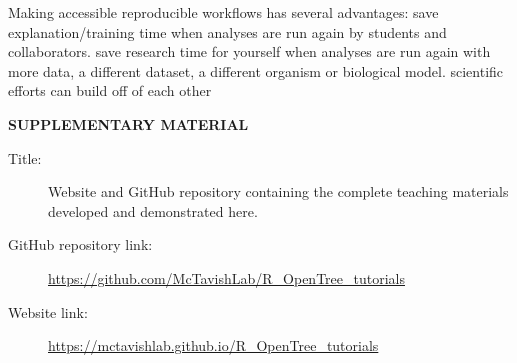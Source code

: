 \documentclass[12pt]{article}
\begin{document}
Making accessible reproducible workflows has several advantages:
save explanation/training time when analyses are run again by students and collaborators.
save research time for yourself when analyses are run again with more data, a different dataset, a different organism or biological model.
scientific efforts can build off of each other

\bigskip
\begin{center}
{\large\bf SUPPLEMENTARY MATERIAL}
\end{center}

\begin{description}

\item[Title:] Website and GitHub repository containing the complete teaching materials developed and demonstrated here.

\item[GitHub repository link:] \url{https://github.com/McTavishLab/R_OpenTree_tutorials}

\item[Website link:] \url{https://mctavishlab.github.io/R_OpenTree_tutorials}

\end{description}




\end{document}
